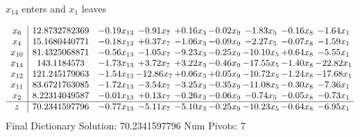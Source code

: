 \documentclass[9pt]{article}
\begin{document}
 $ x_{14} $ enters and $ x_{1} $ leaves 

 \[\begin{array}{c| c c@{\hskip 2pt} c@{\hskip 2pt} c@{\hskip 2pt} c@{\hskip 2pt} c@{\hskip 2pt} c@{\hskip 2pt} c@{\hskip 2pt} }
 x_{6}   &  12.8732782369 & -0.19 x_{13} & -0.91 x_{7} & +  0.16 x_{3} & -0.02 x_{9} & -1.83 x_{5} & -0.16 x_{8} & -1.64 x_{1}\\
 x_{4}   &  15.1680440771 & -0.18 x_{13} & +  0.37 x_{7} & -1.06 x_{3} & -0.09 x_{9} & -2.27 x_{5} & -0.07 x_{8} & -1.59 x_{1}\\
 x_{10}   &  81.4325068871 & -0.56 x_{13} & -1.05 x_{7} & -9.23 x_{3} & -0.25 x_{9} & -10.10 x_{5} & +  0.64 x_{8} & -5.55 x_{1}\\
 x_{14}   &  143.1184573 & -1.73 x_{13} & +  3.72 x_{7} & +  3.22 x_{3} & -0.46 x_{9} & -17.55 x_{5} & -1.40 x_{8} & -22.82 x_{1}\\
 x_{12}   &  121.245179063 & -1.54 x_{13} & -12.86 x_{7} & +  0.06 x_{3} & +  0.05 x_{9} & -10.72 x_{5} & -1.24 x_{8} & -17.68 x_{1}\\
 x_{11}   &  83.6721763085 & -1.72 x_{13} & -3.54 x_{7} & -3.25 x_{3} & -0.35 x_{9} & -11.08 x_{5} & -0.30 x_{8} & -7.36 x_{1}\\
 x_{2}   &  8.22314049587 & -0.01 x_{13} & +  0.13 x_{7} & -0.26 x_{3} & -0.06 x_{9} & -0.74 x_{5} & -0.05 x_{8} & -0.73 x_{1}\\
\hline
z    &  70.2341597796 & -0.77 x_{13} & -5.11 x_{7} & -5.10 x_{3} & -0.25 x_{9} & -10.23 x_{5} & -0.64 x_{8} & -6.95 x_{1}\\
\end{array}\]
Final Dictionary
Solution:  70.2341597796
Num Pivots:  7
\end{document}
